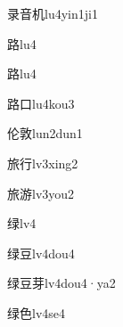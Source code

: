 \begin{verbete}[8;9;6]{录音机}{lu4yin1ji1}
\end{verbete}

\begin{verbete}[13]{路}{lu4}
\end{verbete}
\begin{verbete*}[13]{路}{lu4}
\end{verbete*}

\begin{verbete}[13;3]{路口}{lu4kou3}
\end{verbete}

\begin{verbete*}[6;12]{伦敦}{lun2dun1}
\end{verbete*}

\begin{verbete}[10;6]{旅行}{lv3xing2}
\end{verbete}

\begin{verbete}[10;12]{旅游}{lv3you2}
\end{verbete}

\begin{verbete}[11]{绿}{lv4}
\end{verbete}

\begin{verbete}[11;7]{绿豆}{lv4dou4}
\end{verbete}

\begin{verbete}[11;7;7]{绿豆芽}{lv4dou4·ya2}
\end{verbete}

\begin{verbete}[11;6]{绿色}{lv4se4}
\end{verbete}


